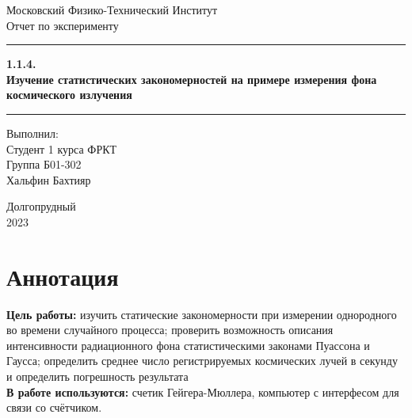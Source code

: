 \documentclass[a4paper, 12pt]{article}
\begin{document}
\begin{titlepage}
    
    \begin{center}
        \vspace*{5cm}
        \Huge Московский Физико-Технический Институт
        \vspace*{2cm}\\
        \LARGE Отчет по эксперименту
        \\\vspace*{0.25cm}
        
        \noindent\rule{\textwidth}{1pt}
        \vspace*{-0.25cm}
        
        \huge \textbf{1.1.4.\\ Изучение статистических закономерностей на примере измерения фона космического излучения}
        \noindent\rule{\textwidth}{1pt}


       \vfill
        \begin{flushright}
            \begin{minipage}{.4\textwidth}
            \Large Выполнил:\\ Студент 1 курса ФРКТ\\ Группа Б01-302 \\Хальфин Бахтияр\\
            \end{minipage}
        \end{flushright}
        
        \vfill
        \normalsize Долгопрудный \\2023
        
    \end{center}
\end{titlepage}
\restoregeometry

\setcounter{page}{2}
\section*{Аннотация}
\textbf{Цель работы:} изучить статические закономерности при измерении однородного во времени случайного процесса; проверить возможность описания интенсивности радиационного фона статистическими законами Пуассона и Гаусса; определить среднее число регистрируемых космических лучей в секунду и определить погрешность результата
\\

\noindent\textbf{В работе используются:} счетик Гейгера-Мюллера, компьютер с интерфесом для связи со счётчиком.
\\
\end{document}
